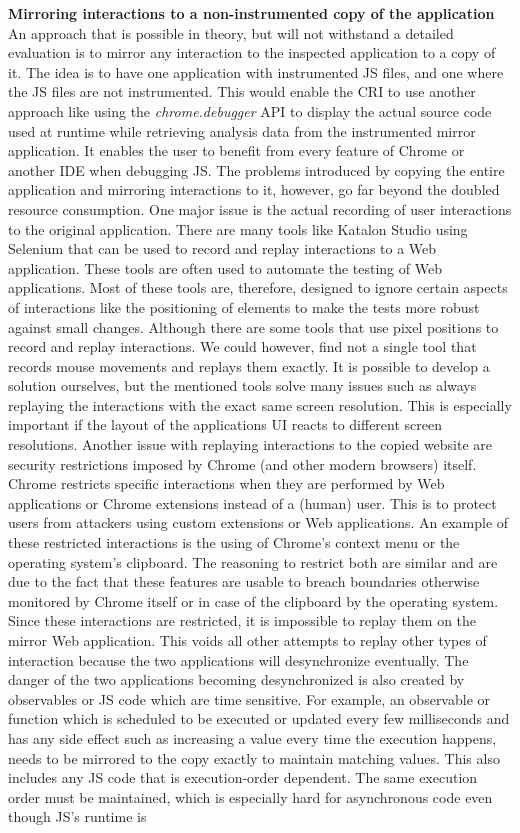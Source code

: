 \noindent\textbf{Mirroring interactions to a non-instrumented copy of the application}\\
An approach that is possible in theory, but will not withstand a detailed evaluation is to mirror any interaction to the inspected application to a copy of it. The idea is to have one application with instrumented JS files, and one where the JS files are not instrumented. This would enable the CRI to use another approach like using the \emph{chrome.debugger} API to display the actual source code used at runtime while retrieving analysis data from the instrumented mirror application. It enables the user to benefit from every feature of Chrome or another IDE when debugging JS. The problems introduced by copying the entire application and mirroring interactions to it, however, go far beyond the doubled resource consumption. One major issue is the actual recording of user interactions to the original application. There are many tools like Katalon Studio \cite{Katalon} using Selenium \cite{Selenium} that can be used to record and replay interactions to a Web application. These tools are often used to automate the testing of Web applications. Most of these tools are, therefore, designed to ignore certain aspects of interactions like the positioning of elements to make the tests more robust against small changes. Although there are some tools that use pixel positions to record and replay interactions. We could however, find not a single tool that records mouse movements and replays them exactly. It is possible to develop a solution ourselves, but the mentioned tools solve many issues such as always replaying the interactions with the exact same screen resolution. This is especially important if the layout of the applications UI reacts to different screen resolutions. Another issue with replaying interactions to the copied website are security restrictions imposed by Chrome (and other modern browsers) itself. Chrome restricts specific interactions when they are performed by Web applications or Chrome extensions instead of a (human) user. This is to protect users from attackers using custom extensions or Web applications. An example of these restricted interactions is the using of Chrome's context menu or the operating system's clipboard. The reasoning to restrict both are similar and are due to the fact that these features are usable to breach boundaries otherwise monitored by Chrome itself or in case of the clipboard by the operating system. Since these interactions are restricted, it is impossible to replay them on the mirror Web application. This voids all other attempts to replay other types of interaction because the two applications will desynchronize eventually. The danger of the two applications becoming desynchronized is also created by observables or JS code which are time sensitive. For example, an observable or function which is scheduled to be executed or updated every few milliseconds and has any side effect such as increasing a value every time the execution happens, needs to be mirrored to the copy exactly to maintain matching values. This also includes any JS code that is execution-order dependent. The same execution order must be maintained, which is especially hard for asynchronous code even though JS's runtime is 
